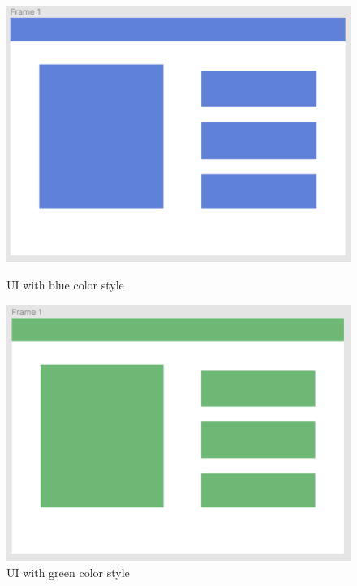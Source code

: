 \begin{figure}[H]
  \centering
  \begin{minipage}[b]{0.48\textwidth}
    \includegraphics[width=\linewidth]{images/layoutBlue.png}
    \caption{UI with blue color style}
    \label{fig:images/layoutBlue}
  \end{minipage}
  \hfill
  \begin{minipage}[b]{0.48\textwidth}
    \includegraphics[width=\linewidth]{images/layoutGreen.png}
    \caption{UI with green color style}
    \label{fig:images/layoutGreen}
  \end{minipage}
\end{figure}



